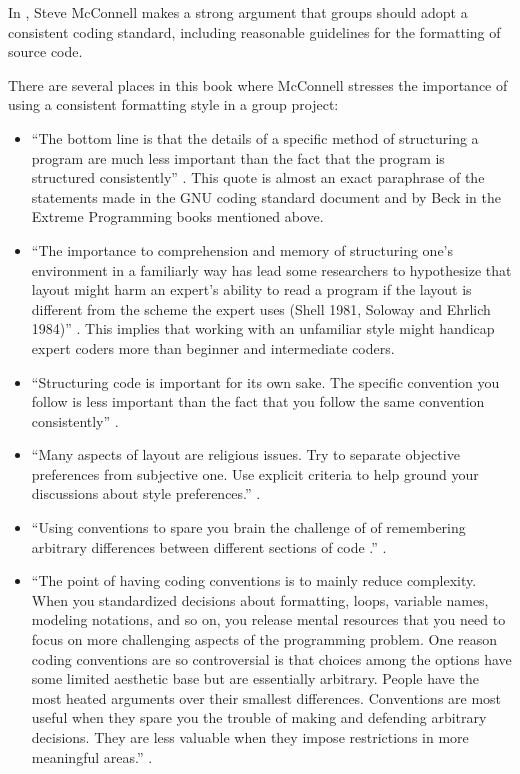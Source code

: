 In {}\cite{CodeComplete2nd04}, Steve McConnell makes a strong argument that
groups should adopt a consistent coding standard, including reasonable
guidelines for the formatting of source code.

There are several places in this book where McConnell stresses the importance
of using a consistent formatting style in a group project:

\begin{itemize}

{}\item ``The bottom line is that the details of a specific method of
structuring a program are much less important than the fact that the program
is structured consistently'' {}\cite[Section 31.1]{CodeComplete2nd04}.  This
quote is almost an exact paraphrase of the statements made in the GNU coding
standard document and by Beck in the Extreme Programming books mentioned
above.

{}\item ``The importance to comprehension and memory of structuring one's
environment in a familiarly way has lead some researchers to hypothesize that
layout might harm an expert's ability to read a program if the layout is
different from the scheme the expert uses (Shell 1981, Soloway and Ehrlich
1984)'' {}\cite[Section 31.1]{CodeComplete2nd04}.  This implies that working
with an unfamiliar style might handicap expert coders more than beginner and
intermediate coders.

{}\item ``Structuring code is important for its own sake.  The specific
convention you follow is less important than the fact that you follow the same
convention consistently'' {}\cite[Chapter 31]{CodeComplete2nd04}.

{}\item ``Many aspects of layout are religious issues.  Try to separate
objective preferences from subjective one.  Use explicit criteria to help
ground your discussions about style preferences.''  {}\cite[Chapter
31]{CodeComplete2nd04}.

{}\item ``Using conventions to spare you brain the challenge of of
remembering arbitrary differences between different sections of code .''
{}\cite[Section 34.1]{CodeComplete2nd04}.

{}\item ``The point of having coding conventions is to mainly reduce
complexity.  When you standardized decisions about formatting, loops, variable
names, modeling notations, and so on, you release mental resources that you
need to focus on more challenging aspects of the programming problem.  One
reason coding conventions are so controversial is that choices among the
options have some limited aesthetic base but are essentially arbitrary.  People
have the most heated arguments over their smallest differences.  Conventions
are most useful when they spare you the trouble of making and defending
arbitrary decisions.  They are less valuable when they impose restrictions in
more meaningful areas.''  {}\cite[Section 34.1]{CodeComplete2nd04}.


\end{itemize}
